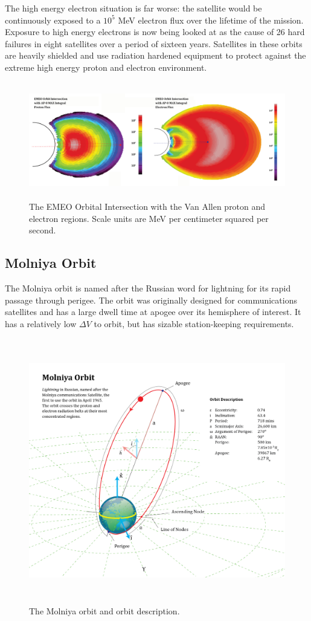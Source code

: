 \documentclass[11pt]{article}
\begin{document}
The high energy electron situation is far worse: the satellite would be continuously exposed to a $10^5$ MeV electron flux over the lifetime of the mission. Exposure to high energy electrons is now being looked at as the cause of 26 hard failures in eight satellites over a period of sixteen years. Satellites in these orbits are heavily shielded and use radiation hardened equipment to protect against the extreme high energy proton and electron environment.

\begin{figure}[!t]
    \centering
    \includegraphics[height=2in]{EMEO_Flux.png}
    \caption{The EMEO Orbital Intersection with the Van Allen proton and electron regions. Scale units are MeV per centimeter squared per second.}
    \label{fig:OHBEMEOVAB}
\end{figure}

\subsection{Molniya Orbit}

The Molniya orbit is named after the Russian word for lightning for its rapid passage through perigee. The orbit was originally designed for communications satellites and has a large dwell time at apogee over its hemisphere of interest. It has a relatively low $\Delta V$ to orbit, but has sizable station-keeping requirements. 

\begin{figure}[H]
    \centering
    \includegraphics[height=4.55in]{assets/Molniya_Diagram.png}
    \caption{The Molniya orbit and orbit description.}
    \label{fig:MOL_Orbit}
\end{figure}
\end{document}
